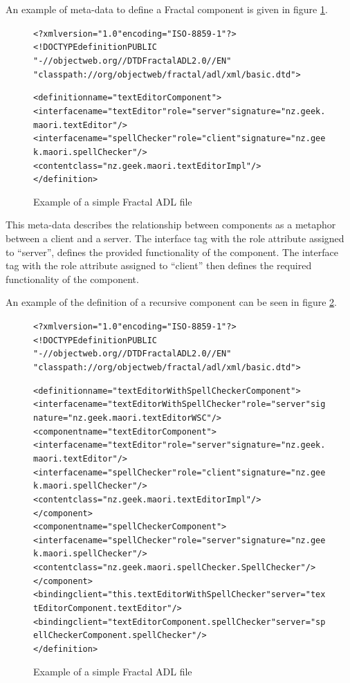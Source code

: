 An example of meta-data to define a Fractal component is given in figure \ref{fractalmetadata}.

\begin{figure}[htp]
\begin{center}
\begin{alltt}
<?xml version="1.0" encoding="ISO-8859-1" ?>
<!DOCTYPE definition PUBLIC 
    "-//objectweb.org//DTD Fractal ADL 2.0//EN" 
    "classpath://org/objectweb/fractal/adl/xml/basic.dtd">

<definition name="textEditorComponent">
  <interface name="textEditor" role="server" signature="nz.geek.maori.textEditor"/>
  <interface name="spellChecker" role="client" signature="nz.geek.maori.spellChecker"/>
  <content class="nz.geek.maori.textEditorImpl"/>
</definition>
\end{alltt}
  \caption[Fractal ADL Example]{Example of a simple Fractal ADL file}
  \label{fractalmetadata}
\end{center}
\end{figure}

This meta-data describes the relationship between components as a metaphor between a client and a server.
The interface tag with the role attribute assigned to ``server'', defines the provided functionality of the component.
The interface tag with the role attribute assigned to ``client'' then defines the required functionality of the component.  

An example of the definition of a recursive component can be seen in figure \ref{fractalrecursve}.

\begin{figure}[htp]
\begin{center}
\begin{alltt}
<?xml version="1.0" encoding="ISO-8859-1" ?>
<!DOCTYPE definition PUBLIC 
    "-//objectweb.org//DTD Fractal ADL 2.0//EN" 
    "classpath://org/objectweb/fractal/adl/xml/basic.dtd">

<definition name="textEditorWithSpellCheckerComponent">
  <interface name="textEditorWithSpellChecker" role="server" signature="nz.geek.maori.textEditorWSC"/>
  <component name="textEditorComponent">
    <interface name="textEditor" role="server" signature="nz.geek.maori.textEditor"/>
    <interface name="spellChecker" role="client" signature="nz.geek.maori.spellChecker"/>
    <content class="nz.geek.maori.textEditorImpl"/>
  </component>
  <component name="spellCheckerComponent">
    <interface name="spellChecker" role="server" signature="nz.geek.maori.spellChecker"/>
    <content class="nz.geek.maori.spellChecker.SpellChecker"/>
  </component>
  <binding client="this.textEditorWithSpellChecker" server="textEditorComponent.textEditor"/>
  <binding client="textEditorComponent.spellChecker" server="spellCheckerComponent.spellChecker"/>
</definition>
\end{alltt}
  \caption[Fractal ADL Example]{Example of a simple Fractal ADL file}
  \label{fractalrecursve}
\end{center}
\end{figure}

